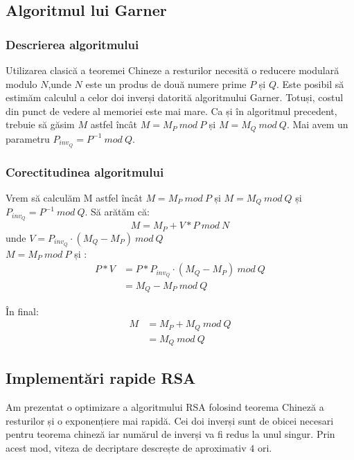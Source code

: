 \documentclass[12]{report}
\begin{document}
	 \subsection{Algoritmul lui Garner}
	  \subsubsection{Descrierea algoritmului}
	  Utilizarea clasică a teoremei Chineze a resturilor necesită o reducere modulară modulo $N$,unde $N$ este un produs de două numere prime $P$ și $Q$. Este posibil să estimăm calculul a celor doi inverși datorită algoritmului Garner. Totuși, costul din punct de vedere al memoriei este mai mare. Ca și în algoritmul precedent, trebuie să găsim $M$ astfel încât $ M = M_P \ mod \ P$ și $M = M_Q \ mod \ Q$. Mai avem un parametru $ P_{inv_Q} = P^{-1} \ mod \ Q$.
	  \subsubsection{Corectitudinea algoritmului}
	  Vrem să calculăm M astfel încât $M =M_P \ mod \ P$ și $M=M_Q \ mod \ Q$ și $P_{inv_Q}=P^{-1} \ mod \ Q$. Să arătăm că: \\
	  $$ M=M_P + V*P \ mod \ N$$
	  unde $ V=P_{inv_Q} \cdot   (M_Q-M_P) \ mod \ Q$ \\
	  $M = M_P \ mod \ P$ și : \\
	  \begin{align*}
	  P*V&= P* P_{inv_Q} \cdot   (M_Q - M_P) \ mod \ Q \\
	   &= M_Q - M_P \ mod \ Q
	  \end{align*}
	  
	  În final: \\
	  \begin{align*}
	   M&= M_P + M_Q \ mod \ Q \\
	   &= M_Q \ mod \ Q 
	  \end{align*}
	  
	  
	  \subsection{Implementări rapide RSA}
	  Am prezentat o optimizare a algoritmului RSA folosind teorema Chineză a resturilor și o exponențiere mai rapidă. Cei doi inverși sunt de obicei necesari pentru teorema chineză iar numărul de inverși va fi redus la unul singur. Prin acest mod, viteza de decriptare descrește de aproximativ $4$ ori.
\end{document}
